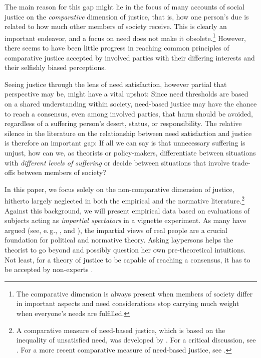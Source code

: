 \documentclass[12pt]{scrartcl}
\begin{document}
The main reason for this gap might lie in the focus of many accounts of social justice on the \textit{comparative} dimension of justice, that is, how one person's due is related to how much other members of society receive.
This is clearly an important endeavor, and a focus on need does not make it obsolete.\footnote{The comparative dimension is always present when members of society differ in important aspects and need considerations stop carrying much weight when everyone's needs are fulfilled.}
However, there seems to have been little progress in reaching common principles of comparative justice accepted by involved parties with their differing interests and their selfishly biased perceptions.

Seeing justice through the lens of need satisfaction, however partial that perspective may be, might have a vital upshot: Since need thresholds are based on a shared understanding within society, need-based justice may have the chance to reach a consensus, even among involved parties, that harm should be avoided, regardless of a suffering person's desert, status, or responsibility.
The relative silence in the literature on the relationship between need satisfaction and justice is therefore an important gap: If all we can say is that unnecessary suffering is unjust, how can we, as theorists or policy-makers, differentiate between situations with \textit{different levels of suffering} or decide between situations that involve trade-offs between members of society?

In this paper, we focus solely on the non-comparative dimension of justice, hitherto largely neglected in both the empirical and the normative literature.\footnote{A comparative measure of need-based justice, which is based on the inequality of unsatisfied need, was developed by \citet{miller_principles_1999}. For a critical discussion, see \citet{siebel_need_2020}. For a more recent comparative measure of need-based justice, see \citet{springhorn_measurement_2022}.}
Against this background, we will present empirical data based on evaluations of subjects acting as \textit{impartial spectators} in a vignette experiment.
As many have argued (see, e.\,g., \citealp{konow_which_2003}, and \citealp{miller_distributive_2017}), the impartial views of real people are a crucial foundation for political and normative theory.
Asking laypersons helps the theorist to go beyond and possibly question her own pre-theoretical intuitions.
Not least, for a theory of justice to be capable of reaching a consensus, it has to be accepted by non-experts \citep[also see][]{bauer_philosophie_2019,bauer_empirical_2020}.
\end{document}
